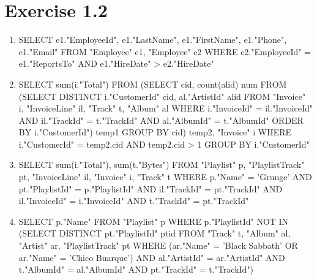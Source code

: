 \documentclass[10pt]{article}
\begin{document}
  \section*{Exercise 1.2}
  \begin{enumerate}[label=\arabic*.]
  \item
 	SELECT e1."EmployeeId", e1."LastName", e1."FirstName", e1."Phone", e1."Email" 
	FROM "Employee" e1, "Employee" e2 
	WHERE e2."EmployeeId" =  e1."ReportsTo" AND e1."HireDate" > e2."HireDate"
  \item
    SELECT sum(i."Total")
    FROM 
    (SELECT cid, count(alid) num FROM 
    (SELECT DISTINCT i."CustomerId" cid, al."ArtistId" alid FROM "Invoice" i, "InvoiceLine" il, "Track" t, "Album" al 
    WHERE i."InvoiceId" = il."InvoiceId" AND il."TrackId" = t."TrackId" AND al."AlbumId" = t."AlbumId"
    ORDER BY i."CustomerId") temp1
    GROUP BY cid) temp2, "Invoice" i
    WHERE i."CustomerId" = temp2.cid AND temp2.cid > 1 GROUP BY i."CustomerId"
  \item
    SELECT sum(i."Total"), sum(t."Bytes")
    FROM "Playlist" p, "PlaylistTrack" pt, "InvoiceLine" il, "Invoice" i, "Track" t
    WHERE p."Name" = 'Grunge' AND pt."PlaylistId" = p."PlaylistId" AND il."TrackId" = pt."TrackId" AND il."InvoiceId" = i."InvoiceId" AND t."TrackId" = pt."TrackId"
  \item
    SELECT p."Name" FROM "Playlist" p
    WHERE p."PlaylistId" NOT IN (SELECT DISTINCT pt."PlaylistId" ptid FROM "Track" t, "Album" al, "Artist" ar, "PlaylistTrack" pt
    WHERE (ar."Name" = 'Black Sabbath' OR ar."Name" = 'Chico Buarque') AND al."ArtistId" = ar."ArtistId" AND t."AlbumId" = al."AlbumId" AND pt."TrackId" = t."TrackId")
\end{enumerate}
\end{document}
